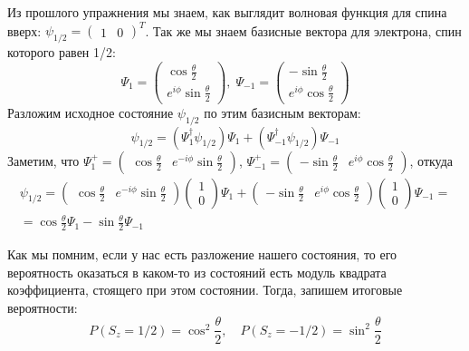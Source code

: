 Из прошлого упражнения мы знаем, как выглядит волновая функция для спина вверх: $\psi_{1/2} =\begin{pmatrix} 1 & 0 \end{pmatrix}^T$. Так же мы знаем базисные вектора для электрона, спин которого равен 1/2: 
\[
\Psi_1 = \begin{pmatrix}  \cos \frac{\theta}{2} \\ e^{i\phi} \sin\frac{\theta}{2}\end{pmatrix},\; \Psi_{-1} = \begin{pmatrix} -\sin\frac{\theta}{2} \\ e^{i\phi}\cos\frac{\theta}{2} \end{pmatrix}
\]
Разложим исходное состояние $\psi_{1/2}$ по этим базисным векторам:
\[
\psi_{1/2} = (\Psi_1^{\dagger}\psi_{1/2})\Psi_1 + (\Psi_{-1}^{\dagger}\psi_{1/2})\Psi_{-1}
\]
Заметим, что $\Psi_1^{+} = \begin{pmatrix} \cos\frac{\theta}{2} & e^{-i\phi}\sin\frac{\theta}{2} \end{pmatrix}$, $\Psi_{-1}^{+} = \begin{pmatrix} -\sin\frac{\theta}{2} & e^{i\phi}\cos\frac{\theta}{2} \end{pmatrix}$, откуда
\begin{gather*}
    \psi_{1/2} = \begin{pmatrix} \cos\frac{\theta}{2} & e^{-i\phi}\sin\frac{\theta}{2} \end{pmatrix} \begin{pmatrix} 1 \\ 0 \end{pmatrix} \Psi_1 + \begin{pmatrix} -\sin\frac{\theta}{2} & e^{i\phi}\cos\frac{\theta}{2} \end{pmatrix} \begin{pmatrix} 1 \\ 0 \end{pmatrix}\Psi_{-1} = \\ = \cos\frac{\theta}{2}\Psi_1 - \sin\frac{\theta}{2}\Psi_{-1}
\end{gather*}

Как мы помним, если у нас есть разложение нашего состояния, то его вероятность оказаться в каком-то из состояний есть модуль квадрата коэффициента, стоящего при этом состоянии. Тогда, запишем итоговые вероятности:
\[
    P\left(S_z = 1/2\right) = \cos^2\frac{\theta}{2},\quad P\left(S_z = -1/2\right) = \sin^2\frac{\theta}{2}
\]
